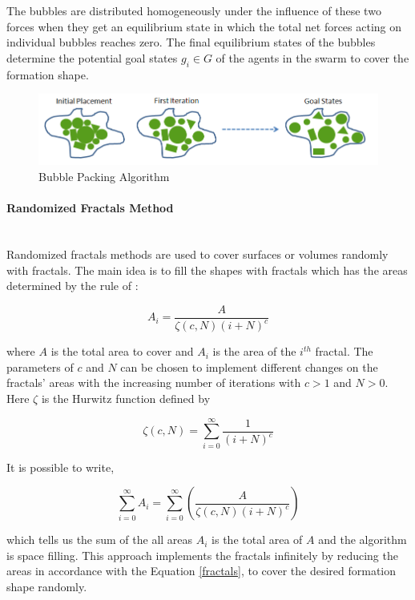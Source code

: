 	
The bubbles are distributed homogeneously under the influence of these two forces when they get an equilibrium state in which the total net forces acting on individual bubbles reaches zero. The final equilibrium states of the bubbles determine the potential goal states $g_i \in G$  of the agents in the swarm to cover the formation shape. 

\begin{figure}[H]
\caption{Bubble Packing Algorithm}
\centering
\includegraphics[scale = 0.62]{bubble_packing2}
\end{figure}

\paragraph{Randomized Fractals Method}\hspace{0pt} \\
Randomized fractals methods are used to cover surfaces or volumes randomly with fractals. The main idea is to fill the shapes with fractals which has the areas determined by the rule of \cite{26} :

\begin{equation} \label{fractals}
A_i = \frac{A}{\zeta(c,N)(i+N)^c}
\end{equation}

where $A$ is the total area to cover and $A_i$ is the area of the $i^{th}$ fractal. The parameters of $c$ and $N$ can be chosen to implement different changes on the fractals' areas with the increasing number of iterations with $c>1$ and $N>0$. Here  $\zeta$ is the Hurwitz function defined by

\begin{equation}
\zeta(c,N) = \sum_{i=0}^{\infty} \frac{1}{(i+N)^c}
\end{equation}

It is possible to write, 
	
\begin{equation}
\sum_{i=0}^{\infty}A_i = \sum_{i = 0}^{\infty}\left(\frac{A}{\zeta(c,N)(i+N)^c}\right)
\end{equation}
	
which tells us the sum of the all areas $A_i$ is the total area of $A$ and the algorithm is space filling. This approach implements the fractals infinitely by reducing the areas in accordance with the Equation \ref{fractals}, to cover the desired formation shape randomly. 

